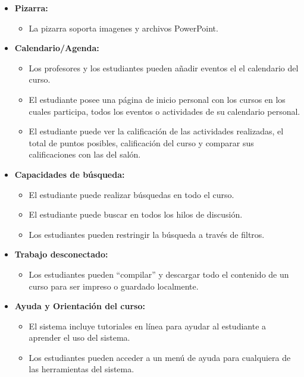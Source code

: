 	\begin{itemize}
		\item \textbf{Pizarra:}
			\begin{itemize}
				\item La pizarra soporta imagenes y archivos PowerPoint.
			\end{itemize}
	\end{itemize}
	\begin{itemize}
		\item \textbf{Calendario/Agenda:}
			\begin{itemize}
				\item Los profesores y los estudiantes pueden añadir eventos el el calendario del curso.
				\item El estudiante posee una página de inicio personal con los cursos en los cuales participa, todos los eventos o actividades de su calendario personal.
				\item El estudiante puede ver la calificación de las actividades realizadas, el total de puntos posibles, calificación del curso y comparar sus calificaciones con las del salón.
			\end{itemize}
	\end{itemize}
	\begin{itemize}
		\item \textbf{Capacidades de búsqueda:}
			\begin{itemize}
				\item El estudiante puede realizar búsquedas en todo el curso.
				\item El estudiante puede buscar en todos los hilos de discusión.
				\item Los estudiantes pueden restringir la búsqueda a través de filtros.
			\end{itemize}
	\end{itemize}
	\begin{itemize}
		\item \textbf{Trabajo desconectado:}
			\begin{itemize}
				\item Los estudiantes pueden ``compilar'' y descargar todo el contenido de un curso para ser impreso o guardado localmente.
			\end{itemize}
	\end{itemize}
	\begin{itemize}
		\item \textbf{Ayuda y Orientación del curso:}
			\begin{itemize}
				\item El sistema incluye tutoriales en línea para ayudar al estudiante a aprender el uso del sistema.
				\item Los estudiantes pueden acceder a un menú de ayuda para cualquiera de las herramientas del sistema.
			\end{itemize}
	\end{itemize}
